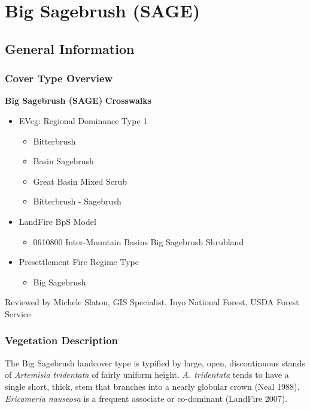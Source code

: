 \newpage

\section{Big Sagebrush (SAGE)}
\label{sage-description}

\subsection*{General Information}

\subsubsection*{Cover Type Overview}

\textbf{Big Sagebrush (SAGE)}
\newline
\textbf{Crosswalks}
\begin{itemize}
	\item EVeg: Regional Dominance Type 1
	\begin{itemize}
		\item Bitterbrush 
		\item Basin Sagebrush
		\item Great Basin Mixed Scrub
		\item Bitterbrush - Sagebrush
	\end{itemize}

	\item LandFire BpS Model
	\begin{itemize}
		\item 0610800 Inter-Mountain Basins Big Sagebrush Shrubland
	\end{itemize}

	\item Presettlement Fire Regime Type
	\begin{itemize}
		\item Big Sagebrush
	\end{itemize}
\end{itemize}

\noindent Reviewed by Michele Slaton, GIS Specialist, Inyo National Forest, USDA Forest Service

\subsubsection*{Vegetation Description}
The Big Sagebrush landcover type is typified by large, open, discontinuous stands of \emph{Artemisia tridentata} of fairly uniform height. \emph{A. tridentata} tends to have a single short, thick, stem that branches into a nearly globular crown (Neal 1988). \emph{Ericameria nauseosa} is a frequent associate or co-dominant (LandFire 2007).

